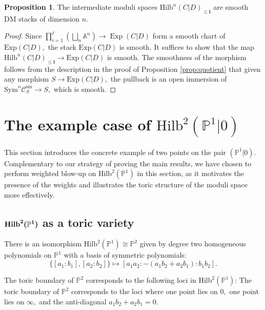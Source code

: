 \documentclass[10.5pt]{amsart}
\theoremstyle{definition}
\theoremstyle{definition}
\theoremstyle{definition}
\theoremstyle{definition}
\newtheorem{proposition}[theorem]{Proposition}
\newcommand{\Exp}{\operatorname{Exp}}
\newcommand{\PP}{\mathbb{P}}
\newcommand{\Hilb}{\mathrm{Hilb}}
\newcommand{\bi}{\boldsymbol{i}}
\begin{document}
\begin{proposition}\label{cor:Hilbsm}
    The intermediate moduli spaces $\Hilb^n(C| D)_{\leq \bi}$ are smooth DM stacks of dimension $n.$
\end{proposition}

\begin{proof}
    

    
    Since $\prod_{i=1}^{\ell}(\bigsqcup_{n}\mathbb{A}^n)\to \Exp(C|D)$ form a smooth chart of $\mathrm{Exp}(C|D),$ the stack $\mathrm{Exp}(C|D)$ is smooth. It suffices to show that the map $\Hilb^n(C| D)_{\leq \bi}\to \mathrm{Exp}(C|D)$ is smooth. The smoothness of the morphism follows from the description in the proof of Proposition \ref{prop:quotient} that given any morphism $S\to \mathrm{Exp}(C|D),$ the pullback is an open immersion of $\mathrm{Sym}^{n}\mathscr{C}^{\mathrm{sm}}_S\to S,$ which is smooth.
\end{proof}




\section{The example case of $\Hilb^2(\PP^1|0)$}\label{sec:2P10}

This section introduces the concrete example of two points on the pair $(\PP^1|0).$ Complementary to our strategy of proving the main results, we have chosen to perform weighted blow-up on $\Hilb^2(\PP^1)$ in this section, as it motivates the presence of the weights and illustrates the toric structure of the moduli space more effectively.

\subsection{$\textbf{\text{Hilb}}^{\boldsymbol{2}}{\boldsymbol{(\PP^1)}}$ as a toric variety}
There is an isomorphism $\Hilb^2(\PP^1)\cong\PP^2$ given by degree two homogeneous polynomials on $\PP^1$ with a basis of symmetric polynomials:
$$\{[a_1: b_1], [a_2: b_2]\}\mapsto [a_1a_2:-(a_1b_2+a_2b_1): b_1b_2].$$

The toric boundary of $\PP^2$ corresponds to the following loci in $\Hilb^2(\PP^1)$: 
{The toric boundary of $\PP^2$ corresponds to the loci where one point lies on $0,$ one point lies on $\infty,$ and the anti-diagonal $a_1b_2 + a_2b_1 = 0.$}
\end{document}
